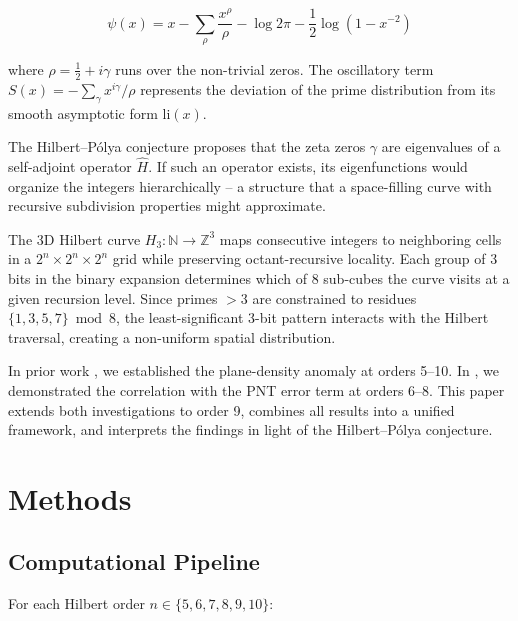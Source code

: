 \documentclass[11pt,a4paper]{article}
\begin{document}
\begin{equation}
\psi(x) = x - \sum_{\rho} \frac{x^{\rho}}{\rho}
- \log 2\pi - \frac{1}{2}\log(1 - x^{-2})
\label{eq:explicit}
\end{equation}

where $\rho = \frac{1}{2} + i\gamma$ runs over the non-trivial zeros.
The oscillatory term $S(x) = -\sum_\gamma x^{i\gamma}/\rho$ represents
the deviation of the prime distribution from its smooth asymptotic form
$\text{li}(x)$.

The Hilbert--P\'{o}lya conjecture \cite{hilbertpolya} proposes that the
zeta zeros $\gamma$ are eigenvalues of a self-adjoint operator $\hat{H}$.
If such an operator exists, its eigenfunctions would organize the integers
hierarchically -- a structure that a space-filling curve with recursive
subdivision properties might approximate.

The 3D Hilbert curve $H_3: \mathbb{N} \to \mathbb{Z}^3$ maps consecutive
integers to neighboring cells in a $2^n \times 2^n \times 2^n$ grid while
preserving octant-recursive locality. Each group of 3 bits in the binary
expansion determines which of 8 sub-cubes the curve visits at a given
recursion level. Since primes $>3$ are constrained to residues $\{1,3,5,7\}
\bmod 8$, the least-significant 3-bit pattern interacts with the Hilbert
traversal, creating a non-uniform spatial distribution.

In prior work \cite{wesson2026a}, we established the plane-density anomaly
at orders 5--10. In \cite{wesson2026b}, we demonstrated the correlation with
the PNT error term at orders 6--8. This paper extends both investigations
to order 9, combines all results into a unified framework, and interprets
the findings in light of the Hilbert--P\'{o}lya conjecture.

\section{Methods}

\subsection{Computational Pipeline}

For each Hilbert order $n \in \{5, 6, 7, 8, 9, 10\}$:
\end{document}
